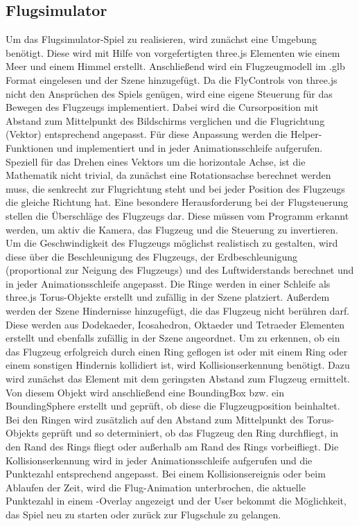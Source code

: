 \subsection{Flugsimulator}

Um das Flugsimulator-Spiel zu realisieren, wird zunächst eine Umgebung benötigt.
Diese wird mit Hilfe von vorgefertigten three.js Elementen wie einem Meer und einem Himmel erstellt.
Anschließend wird ein Flugzeugmodell im .glb Format eingelesen und der Szene hinzugefügt.
\newparagraph
Da die FlyControls von three.js nicht den Ansprüchen des Spiels genügen, wird eine eigene Steuerung für das Bewegen des Flugzeugs implementiert.
Dabei wird die Cursorposition mit Abstand zum Mittelpunkt des Bildschirms verglichen und die Flugrichtung (Vektor) entsprechend angepasst.
Für diese Anpassung werden die Helper-Funktionen  und  implementiert und in jeder Animationsschleife aufgerufen.
Speziell für das Drehen eines Vektors um die horizontale Achse, ist die Mathematik nicht trivial, da zunächst eine Rotationsachse berechnet werden muss, die senkrecht zur Flugrichtung steht und bei jeder Position des Flugzeugs die gleiche Richtung hat.
Eine besondere Herausforderung bei der Flugsteuerung stellen die Überschläge des Flugzeugs dar.
Diese müssen vom Programm erkannt werden, um aktiv die Kamera, das Flugzeug und die Steuerung zu invertieren.
Um die Geschwindigkeit des Flugzeugs möglichst realistisch zu gestalten, wird diese über die Beschleunigung des Flugzeugs, der Erdbeschleunigung (proportional zur Neigung des Flugzeugs) und des Luftwiderstands berechnet und in jeder Animationsschleife angepasst.
\newparagraph
Die Ringe werden in einer Schleife als three.js Torus-Objekte erstellt und zufällig in der Szene platziert.
Außerdem werden der Szene Hindernisse hinzugefügt, die das Flugzeug nicht berühren darf.
Diese werden aus Dodekaeder, Icosahedron, Oktaeder und Tetraeder Elementen erstellt und ebenfalls zufällig in der Szene angeordnet.
\newparagraph
Um zu erkennen, ob ein das Flugzeug erfolgreich durch einen Ring geflogen ist oder mit einem Ring oder einem sonstigen Hindernis kollidiert ist, wird Kollisionserkennung benötigt.
Dazu wird zunächst das Element mit dem geringsten Abstand zum Flugzeug ermittelt.
Von diesem Objekt wird anschließend eine BoundingBox bzw. ein BoundingSphere erstellt und geprüft, ob diese die Flugzeugposition beinhaltet.
Bei den Ringen wird zusätzlich auf den Abstand zum Mittelpunkt des Torus-Objekts geprüft und so determiniert, ob das Flugzeug den Ring durchfliegt, in den Rand des Rings fliegt oder außerhalb am Rand des Rings vorbeifliegt.
Die Kollisionserkennung wird in jeder Animationsschleife aufgerufen und die Punktezahl entsprechend angepasst.
Bei einem Kollisionsereignis oder beim Ablaufen der Zeit, wird die Flug-Animation unterbrochen, die aktuelle Punktezahl in einem -Overlay angezeigt und der User bekommt die Möglichkeit, das Spiel neu zu starten oder zurück zur Flugschule zu gelangen.

